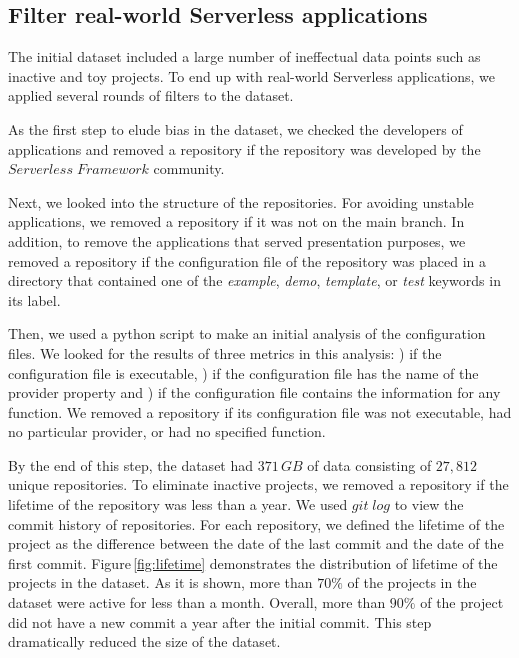 \subsection{Filter real-world Serverless applications} \label{phaseB}
The initial dataset included a large number of ineffectual data points 
such as inactive and toy projects. To end up with real-world Serverless 
applications, we applied several rounds of filters to the dataset.

As the first step to elude bias in the dataset, we checked the developers 
of applications and removed a repository if the repository was developed 
by the $Serverless \; Framework$ community. 

Next, we looked into the structure of the repositories. 
For avoiding unstable applications, we removed a repository if it was not 
on the main branch. In addition, to remove the applications that served 
presentation purposes, we removed a repository if the configuration file 
of the repository was placed in a directory that contained one of the 
\emph{example}, \emph{demo}, \emph{template}, or \emph{test} 
keywords in its label.

Then, we used a python script to make an initial analysis of the 
configuration files. We looked for the results of three metrics in this 
analysis: ) if the configuration file is executable, ) if 
the configuration file has the name of the provider property and 
) if the configuration file contains the information for any 
function. We removed a repository if its configuration file was not 
executable, had no particular provider, or had no specified function.

By the end of this step, the dataset had $371 \, GB$ of data consisting 
of $27,812$ unique repositories. To eliminate inactive projects, we 
removed a repository if the lifetime of the repository was less than 
a year. We used $git \; log$ to view the commit history of repositories. 
For each repository, we defined the lifetime of the project as the difference 
between the date of the last commit and the date of the first commit. 
Figure\,\ref{fig:lifetime} demonstrates the distribution of lifetime of the 
projects in the dataset. As it is shown, more than $70\%$ of the projects 
in the dataset were active for less than a month. Overall, more than $90\%$ 
of the project did not have a new commit a year after the initial commit. 
This step dramatically reduced the size of the dataset.

